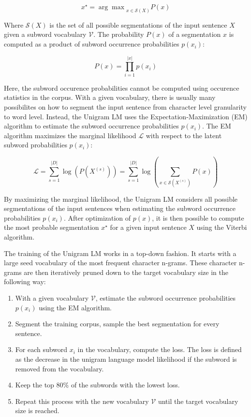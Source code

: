 \begin{equation}
    x^\star = {\arg\max}_{x \in \mathcal{S}(X)} P(x)
\end{equation}


Where $\mathcal{S}(X)$ is the set of all possible segmentations of the input sentence $X$ given a subword vocabulary $\mathcal{V}$. The probability $P(x)$ of a segmentation $x$ is computed as a product of subword occurrence probabilities $p(x_i)$:

\begin{equation}
    P(x) = \prod_{i=1}^{|x|} p(x_i)
\end{equation}

Here, the subword occurence probabilities cannot be computed using occurence statistics in the corpus. With a given vocabulary, there is usually many possibilites on how to segment the input sentence from character level granularity to word level. Instead, the Unigram LM uses the Expectation-Maximization (EM) algorithm to estimate the subword occurrence probabilities $p(x_i)$. The EM algorithm maximizes the marginal likelihood $\mathcal{L}$ with respect to the latent subword probabilities $p(x_i)$:

\begin{equation}
    \mathcal{L} = \sum_{s=1}^{|D|} \log (P(X^{(s)})) = \sum_{s=1}^{|D|} \log( \sum_{x \in \mathcal{S}(X^{(s)})} P(x) )
\end{equation}

By maximizing the marginal likelihood, the Unigram LM considers all possible segmentations of the input sentences when estimating the subword occurrence probabilities $p(x_i)$. After optimization of $p(x)$, it is then possible to compute the most probable segmentation $x^\star$ for a given input sentence $X$ using the Viterbi algorithm.

The training of the Unigram LM works in a top-down fashion. It starts with a large seed vocabulary of the most frequent character n-grams. These character n-grams are then iteratively pruned down to the target vocabulary size in the following way:

\begin{enumerate}
    \item With a given vocabulary $\mathcal{V}$, estimate the subword occurrence probabilities $p(x_i)$ using the EM algorithm.
    \item Segment the training corpus, sample the best segmentation for every sentence.
    \item For each subword $x_i$ in the vocabulary, compute the loss. The loss is defined as the decrease in the unigram language model likelihood if the subword is removed from the vocabulary.
    \item Keep the top 80\% of the subwords with the lowest loss.
    \item Repeat this process with the new vocabulary $\mathcal{V}$ until the target vocabulary size is reached.
\end{enumerate}

